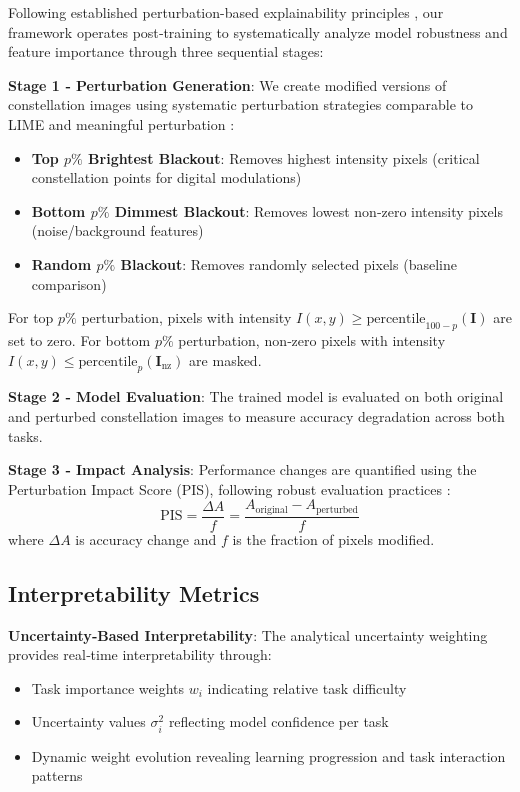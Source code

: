 \documentclass{ELSP}
\begin{document}
Following established perturbation-based explainability principles \cite{fong2017interpretable,IVANOVS2021228}, our framework operates post‑training to systematically analyze model robustness and feature importance through three sequential stages:

\textbf{Stage 1 ‑ Perturbation Generation}: We create modified versions of constellation images using systematic perturbation strategies comparable to LIME \cite{10.1145/2939672.2939778} and meaningful perturbation \cite{fong2017interpretable}:
\begin{itemize}
\item \textbf{Top $p\%$ Brightest Blackout}: Removes highest intensity pixels (critical constellation points for digital modulations)
\item \textbf{Bottom $p\%$ Dimmest Blackout}: Removes lowest non‑zero intensity pixels (noise/background features)  
\item \textbf{Random $p\%$ Blackout}: Removes randomly selected pixels (baseline comparison)
\end{itemize}

For top $p\%$ perturbation, pixels with intensity $I(x,y) \geq \text{percentile}_{100-p}(\mathbf{I})$ are set to zero. For bottom $p\%$ perturbation, non‑zero pixels with intensity $I(x,y) \leq \text{percentile}_p(\mathbf{I}_{\text{nz}})$ are masked.

\textbf{Stage 2 ‑ Model Evaluation}: The trained model is evaluated on both original and perturbed constellation images to measure accuracy degradation across both tasks.

\textbf{Stage 3 ‑ Impact Analysis}: Performance changes are quantified using the Perturbation Impact Score (PIS), following robust evaluation practices \cite{fel2023don}:
\begin{equation}
\text{PIS} = \frac{\Delta A}{f} = \frac{A_{\text{original}} - A_{\text{perturbed}}}{f}
\end{equation}
where $\Delta A$ is accuracy change and $f$ is the fraction of pixels modified.

\subsection{Interpretability Metrics}

\textbf{Uncertainty‑Based Interpretability}: The analytical uncertainty weighting provides real‑time interpretability through:
\begin{itemize}
\item Task importance weights $w_i$ indicating relative task difficulty
\item Uncertainty values $\sigma_i^2$ reflecting model confidence per task
\item Dynamic weight evolution revealing learning progression and task interaction patterns
\end{itemize}
\end{document}
